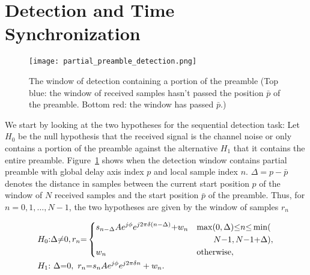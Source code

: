 \section{Detection and Time Synchronization}
\label{sec:detection}

\begin{figure}[t]
  \centerline{\texttt{[image: partial\_preamble\_detection.png]}}
  \caption{The window of detection containing a portion of the preamble (Top blue: the window of received samples hasn't passed the position $\bar{p}$ of the preamble. Bottom red: the window has passed $\bar{p}$.)}
  \label{fig:partial_preamble_detection}
  \end{figure}

We start by looking at the two hypotheses for the sequential detection task:
Let $H_0$ be the null hypothesis that the received signal is the channel noise or only contains a portion of the preamble against the alternative $H_1$ that it contains the entire preamble. 
Figure~\ref{fig:partial_preamble_detection} shows when the detection window contains
partial preamble with global delay axis index $p$ and local sample index $n$.
$\Delta=p-\bar{p}$ denotes the distance in samples between the current start position $p$ of the window of $N$ received samples and the start position $\bar{p}$ of the preamble.
Thus, for $n=0,1,\ldots,N-1$, the two hypotheses are given by the window of samples $r_n$

\begin{equation}
  \label{eq:two hypotheses}
  \begin{aligned}
  &H_0{:}\Delta {\neq} 0,r_n{=}
  \begin{dcases}
      s_{n-\Delta}Ae^{j\phi}e^{j2\pi\delta (n-\Delta)}{+}w_n & \max(0,\Delta){\leq} n{\leq} \min( \\
      & ~~~~~~N{-}1,N{-}1{+}\Delta), \\
      w_n & \text{otherwise},
  \end{dcases} \\
  &H_1{:}~\Delta {=} 0,~r_n{=}s_nAe^{j\phi}e^{j2\pi\delta n}+w_n.
  \end{aligned}
\end{equation}


